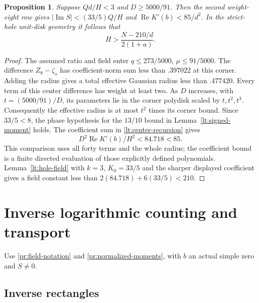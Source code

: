 \documentclass[11pt,reqno]{amsart}
\numberwithin{equation}{section}
\newtheorem{proposition}[theorem]{Proposition}
\theoremstyle{definition}
\theoremstyle{remark}
\renewcommand{\Re}{\operatorname{Re}}
\renewcommand{\Im}{\operatorname{Im}}
\begin{document}
\begin{proposition}\label{lt:W8-field}
Suppose $Qd/H<3$ and $D\ge5000/91$. Then the second weight-eight
row gives $|\Im S|<(33/5)Q/H$ and
$\Re K'(b)<85/d^2$. In the strict-hole unit-disk geometry it follows
that
\begin{equation}\label{lt:field210}
 H>\frac{N-210/d}{2(1+a)}.
\end{equation}
\end{proposition}
\begin{proof}
The assumed ratio and field enter $q\le273/5000$, $\mu\le91/5000$.
The difference $Z_8-\zeta_s$ has coefficient-norm sum less
than $.397022$ at this corner. Adding the radius gives a
total effective Gaussian radius less than $.477420$.
Every term of this center difference has weight at least two.
As $D$ increases, with $t=(5000/91)/D$, its parameters lie in the
corner polydisk scaled by $t,t^2,t^3$. Consequently the effective
radius is at most $t^2$ times its corner bound.
Since $33/5<8$, the phase hypothesis for the $13/10$ bound in
Lemma~\ref{lt:signed-moment} holds. The coefficient sum in
\eqref{lt:center-recursion} gives
\[
 D^2\Re K'(b)/H^2<84.718<85.
\]
This comparison uses all forty terms and the whole radius; the
coefficient bound is a finite directed evaluation of those explicitly
defined polynomials. Lemma~\ref{lt:hole-field} with $k=3$,
$K_0=33/5$ and the sharper displayed coefficient gives a field
constant less than $2(84.718)+6(33/5)<210$.
\end{proof}

\section{Inverse logarithmic counting and transport}\label{sec:inverse-tools}

Use \eqref{pr:field-notation} and \eqref{pr:normalized-moments},
with $b$ an actual simple zero and $S\ne0$.

\subsection{Inverse rectangles}
\end{document}
